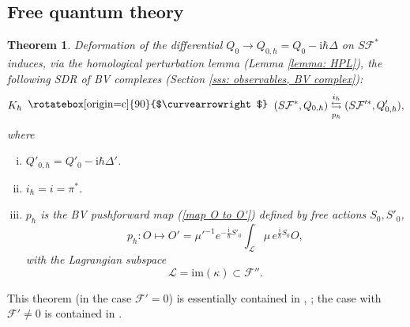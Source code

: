 \documentclass{amsart}
\theoremstyle{plain} %
\newtheorem{thm}{Theorem}[section]
\theoremstyle{definition}
\theoremstyle{remark}
\newcommand{\mr}{\mathrm}
\newcommand{\ra}{\rightarrow}
\newcommand{\F}{\mathcal{F}}
\newcommand{\LL}{\mathcal{L}}
\newcommand{\iii}{\mathrm{i}}
\newcommand{\SDR}[5]{#5\;\;\raisebox{1.3pt}{\rotatebox[origin=c]{90}{$\curvearrowright$}}\;\; #1 \underset{#4}{\stackrel{#3}{\leftrightarrows}} #2}  %
\begin{document}

\subsection{%
Free quantum theory
}

\begin{thm}\label{thm SDR for free quantum BV complexes}
    Deformation of the differential $Q_0\ra Q_{0,\hbar}=Q_0-\iii\hbar \Delta$ on $S\F^*$ induces, via the homological perturbation lemma (Lemma \ref{lemma: HPL}), the following SDR of BV complexes (Section \ref{sss: observables, BV complex}):
    \begin{equation}\label{ihbar phbar Khbar}
        \SDR{(S\F^*,Q_{0,\hbar} %
        )}{(S\F'^*,Q'_{0,\hbar} %
        )}{i_\hbar}{p_\hbar}{K_\hbar},
    \end{equation}
    where
    \begin{enumerate}[(i)]
        \item \label{thm SDR for free quantum BV complexes, (i)} $Q'_{0,\hbar}=Q'_0-\iii\hbar\Delta'$.
        \item \label{thm SDR for free quantum BV complexes, (ii)} $i_\hbar=i=\pi^*$.
        \item \label{thm SDR for free quantum BV complexes, (iii)} $p_\hbar$ is the BV pushforward map (\ref{map O to O'}) defined by free actions $S_0,S'_0$,
        \begin{equation}\label{p_hbar}
            p_\hbar\colon O\mapsto O'=\mu'^{-1}e^{-\frac{\iii}{\hbar}S'_0}\int_\LL \mu\, e^{\frac{\iii}{\hbar}S_0}O,
        \end{equation}
        with the Lagrangian subspace
        \begin{equation}\label{L=im(kappa)}
            \LL=\mr{im}(\kappa)\subset \F''.
        \end{equation}
    \end{enumerate}
\end{thm}
This theorem (in the case $\F'=0$) is essentially contained in \cite{Gwilliam}, \cite{GJF}; the case with $\F'\neq 0$ is contained in \cite[Proof of Theorem 2]{DJP}. %
\end{document}
